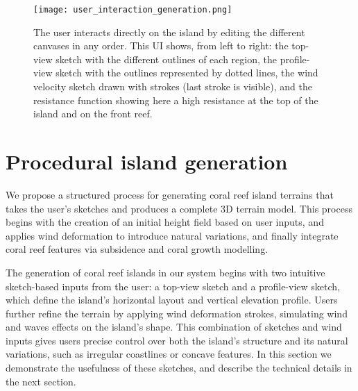 \begin{figure}
    \texttt{[image: user\_interaction\_generation.png]}
    \caption{The user interacts directly on the island by editing the different canvases in any order. This UI shows, from left to right: the top-view sketch with the different outlines of each region, the profile-view sketch with the outlines represented by dotted lines, the wind velocity sketch drawn with strokes (last stroke is visible), and the resistance function showing here a high resistance at the top of the island and on the front reef.}
    \label{fig:coral-island-wind-from-strokes-interaction}
\end{figure}


























\section{Procedural island generation}
\label{sec:coral-island-example-generation}

We propose a structured process for generating coral reef island terrains that takes the user's sketches and produces a complete 3D terrain model. This process begins with the creation of an initial height field based on user inputs, and applies wind deformation to introduce natural variations, and finally integrate coral reef features via subsidence and coral growth modelling.


The generation of coral reef islands in our system begins with two intuitive sketch-based inputs from the user: a top-view sketch and a profile-view sketch, which define the island's horizontal layout and vertical elevation profile. Users further refine the terrain by applying wind deformation strokes, simulating wind and waves effects on the island's shape. This combination of sketches and wind inputs gives users precise control over both the island's structure and its natural variations, such as irregular coastlines or concave features. In this section we demonstrate the usefulness of these sketches, and describe the technical details in the next section.

